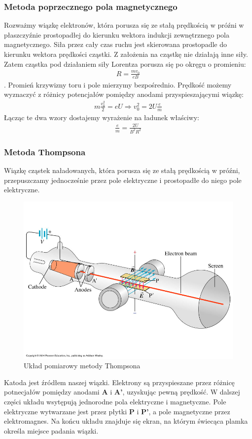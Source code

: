 \documentclass[paper=a4, fontsize=12pt]{scrartcl}
\begin{document}
\subsubsection{Metoda poprzecznego pola magnetycznego}  Rozważmy wiązkę elektronów, która porusza się ze stałą prędkością  w próźni w płaszczyźnie prostopadłej do kierunku wektora indukcji zewnętrznego pola magnetycznego. 
Siła przez cały czas ruchu jest skierowana prostopadle do kierunku wektora prędkości cząstki. Z założenia na cząstkę  nie działają inne siły. Zatem cząstka pod działaniem siły Lorentza porusza się po okręgu o promieniu: \begin{align*}
R=\frac{mv_0}{eB}
\end{align*}.
Promień krzywizny toru i pole mierzymy bezpośrednio. Prędkość możemy wyznaczyć z różnicy potencjałów pomiędzy anodami przyspieszającymi wiązkę:
\begin{align*}
m\frac{v_0^2}{2}=eU\Rightarrow v_0^2=2U\frac{e}{m}
\end{align*}
Łącząc te dwa wzory dostajemy wyrażenie na ładunek właściwy:
\begin{align}
\frac{e}{m}=\frac{2U}{B^2R^2}
\end{align}

\subsubsection{Metoda Thompsona}
Wiązkę cząstek naładowanych, która porusza się ze stałą prędkością  w próźni, przepuszczamy jednocześnie przez pole elektryczne i prostopadłe do niego pole elektryczne. 
\begin{figure}[h!]
\centering
\includegraphics[width=0.5\linewidth]{thla}
\caption{Układ pomiarowy metody Thompsona}
\label{fig:thla}
\end{figure}

Katoda jest źródłem naszej wiązki. Elektrony są przyspieszane przez różnicę potnecjałów pomiędzy anodami \textbf{A} i \textbf{A'}, uzyskując pewną prędkość. W dalszej części układu wsytępują jednorodne pola elektryczne i magnetyczne. Pole elektryczne wytwarzane jest przez płytki \textbf{P} i \textbf{P'}, a pole magnetyczne przez elektromagnes.
Na końcu układu znajduje się ekran, na którym świecąca plamka określa miejsce padania wiązki.\\
\end{document}

